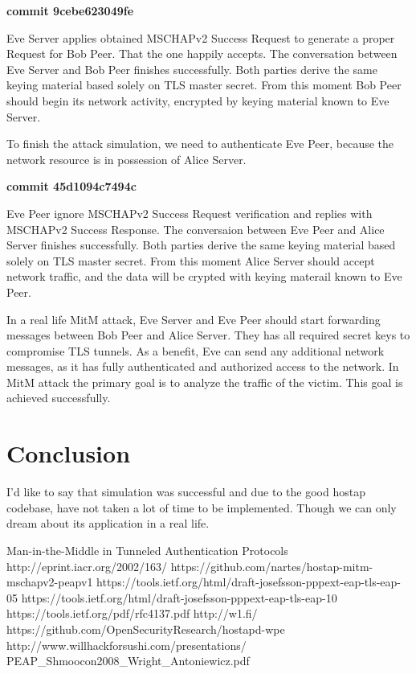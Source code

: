 \documentclass{amsart}
\begin{document}
\textbf{commit 9cebe623049fe}

Eve Server applies obtained MSCHAPv2 Success Request to generate
a proper Request for Bob Peer. That the one happily accepts.
The conversation between Eve Server and Bob Peer finishes successfully.
Both parties derive the same keying material based solely on TLS master secret.
From this moment Bob Peer should begin
its network activity, encrypted by keying material known to Eve Server.

To finish the attack simulation, we need to authenticate Eve Peer,
because the network resource is in possession of Alice Server.

\textbf{commit 45d1094c7494c}

Eve Peer ignore MSCHAPv2 Success Request verification and replies
with MSCHAPv2 Success Response. The conversaion between Eve Peer
and Alice Server finishes successfully. Both parties derive
the same keying material based solely on TLS master secret.
From this moment Alice Server should accept
network traffic, and the data will be crypted with keying materail
known to Eve Peer.

In a real life MitM attack, Eve Server and Eve Peer should
start forwarding messages between Bob Peer and Alice Server.
They has all required secret keys to compromise TLS tunnels.
As a benefit, Eve can send any additional network messages,
as it has fully authenticated and authorized access
to the network.
In MitM attack the primary goal is to analyze the traffic
of the victim. This goal is achieved successfully.

\section{Conclusion}
I'd like to say that simulation was successful
and due to the good hostap codebase, have not taken
a lot of time to be implemented.
Though we can only dream about its application in a real life.

\begin{thebibliography}{99}
    Man-in-the-Middle in Tunneled Authentication Protocols \\
    http://eprint.iacr.org/2002/163/
    https://github.com/nartes/hostap-mitm-mschapv2-peapv1
    https://tools.ietf.org/html/draft-josefsson-pppext-eap-tls-eap-05
    https://tools.ietf.org/html/draft-josefsson-pppext-eap-tls-eap-10
    https://tools.ietf.org/pdf/rfc4137.pdf
    http://w1.fi/
    https://github.com/OpenSecurityResearch/hostapd-wpe
    http://www.willhackforsushi.com/presentations/\\
    PEAP\_Shmoocon2008\_Wright\_Antoniewicz.pdf
\end{thebibliography}
\end{document}
